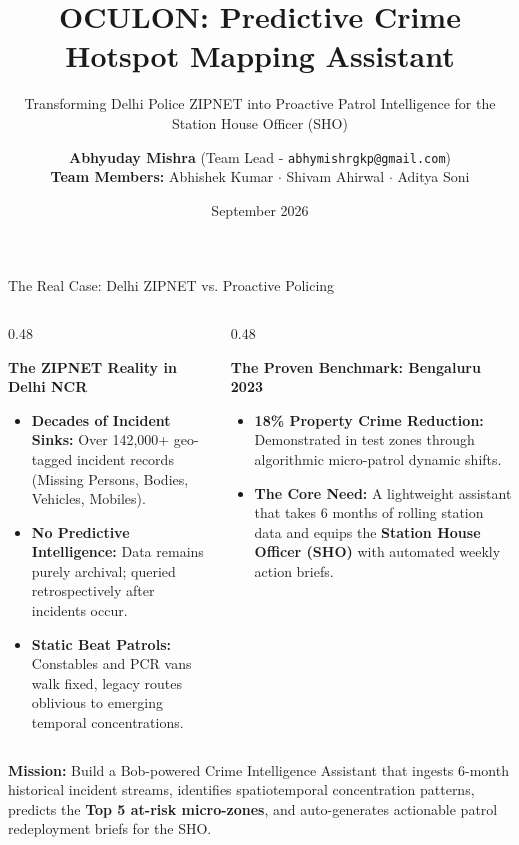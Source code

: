 \documentclass[aspectratio=169,10pt]{beamer}
\title[Oculon: Predictive Crime Hotspot Mapping Assistant]{\textbf{OCULON: Predictive Crime Hotspot Mapping Assistant}}
\subtitle{Transforming Delhi Police ZIPNET into Proactive Patrol Intelligence for the Station House Officer (SHO)}
\author[Team Oculon]{%
  \textbf{Abhyuday Mishra} (Team Lead - \texttt{abhymishrgkp@gmail.com})\\
  \vspace{0.15cm}
  {\footnotesize \textbf{Team Members:} Abhishek Kumar $\cdot$ Shivam Ahirwal $\cdot$ Aditya Soni}
}
\institute[DelhiHotspots\_ML]{%
  \textsf{IBM Bob AI Hackathon 2026} \\
  \textsf{Repository: \url{https://github.com/abhyudaymishr/oculon}}
}
\date{September 2026}
\begin{document}
\begin{frame}[plain]
  \titlepage
\end{frame}

\begin{frame}{The Real Case: Delhi ZIPNET vs. Proactive Policing}
  \begin{columns}[T]
    \begin{column}{0.48\textwidth}
      \begin{block}{\textbf{The ZIPNET Reality in Delhi NCR}}
        \begin{itemize}\itemsep=0.4em
          \item \textbf{Decades of Incident Sinks:} Over 142,000+ geo-tagged incident records (Missing Persons, Bodies, Vehicles, Mobiles).
          \item \textbf{No Predictive Intelligence:} Data remains purely archival; queried retrospectively after incidents occur.
          \item \textbf{Static Beat Patrols:} Constables and PCR vans walk fixed, legacy routes oblivious to emerging temporal concentrations.
        \end{itemize}
      \end{block}
    \end{column}

    \begin{column}{0.48\textwidth}
      \begin{alertblock}{\textbf{The Proven Benchmark: Bengaluru 2023}}
        \begin{itemize}\itemsep=0.4em
          \item \textbf{18\% Property Crime Reduction:} Demonstrated in test zones through algorithmic micro-patrol dynamic shifts.
          \item \textbf{The Core Need:} A lightweight assistant that takes 6 months of rolling station data and equips the \textbf{Station House Officer (SHO)} with automated weekly action briefs.
        \end{itemize}
      \end{alertblock}
    \end{column}
  \end{columns}

  \vspace{0.4cm}
  \begin{center}
    \colorbox{CardBg}{\parbox{0.95\textwidth}{\centering \textbf{Mission:} Build a Bob-powered Crime Intelligence Assistant that ingests 6-month historical incident streams, identifies spatiotemporal concentration patterns, predicts the \textbf{Top 5 at-risk micro-zones}, and auto-generates actionable patrol redeployment briefs for the SHO.}}
  \end{center}
\end{frame}
\end{document}
